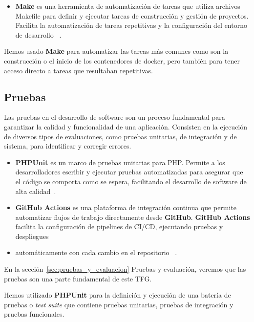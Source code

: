 \begin{itemize}
    \item \textbf{Make}
    es una herramienta de automatización de tareas que utiliza archivos Makefile para definir y ejecutar tareas de
    construcción y gestión de proyectos.
    Facilita la automatización de tareas repetitivas y la configuración del entorno de desarrollo
    ~\cite{https://www.gnu.org/software/make/manual/}.
\end{itemize}

Hemos usado \textbf{Make} para automatizar las tareas más comunes como son la construcción o el inicio de los
contenedores de docker, pero también para tener acceso directo a tareas que resultaban repetitivas.

\subsection*{Pruebas}

Las pruebas en el desarrollo de software son un proceso fundamental para garantizar la calidad y funcionalidad de una
aplicación.
Consisten en la ejecución de diversos tipos de evaluaciones, como pruebas unitarias, de integración y de sistema, para
identificar y corregir errores.

\begin{itemize}
    \item \textbf{PHPUnit} es un marco de pruebas unitarias para PHP. Permite a los desarrolladores escribir y
    ejecutar pruebas automatizadas para asegurar que el código se comporta como se espera, facilitando el desarrollo de
    software de alta calidad~\cite{https://phpunit.de/manual/current/en/}.
    \item \textbf{GitHub Actions} es una plataforma de integración continua que permite automatizar flujos de
    trabajo directamente desde \textbf{GitHub}.
    \textbf{GitHub Actions} facilita la configuración de pipelines de CI/CD, ejecutando pruebas y despliegues
    \item automáticamente con cada cambio en el repositorio ~\cite{https://docs.github.com/en/actions}.
\end{itemize}

En la sección~\ref{sec:pruebas_y_evaluacion} Pruebas y evaluación, veremos que las pruebas son una parte fundamental
de este TFG.

Hemos utilizado \textbf{PHPUnit} para la definición y ejecución de una batería de pruebas o \textit{test suite} que
contiene pruebas unitarias, pruebas de integración y pruebas funcionales.

